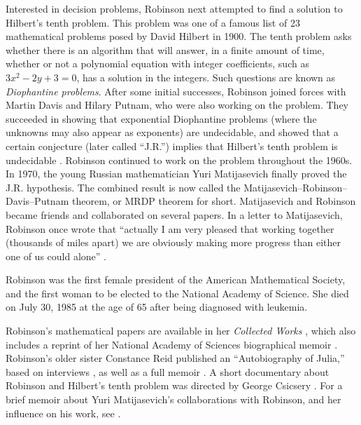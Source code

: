 \documentclass[../../../include/open-logic-section]{subfiles}
\begin{document}
Interested in decision problems, Robinson next attempted to find a
solution to Hilbert's tenth problem. This problem was one of a famous
list of 23 mathematical problems posed by David Hilbert in 1900. The
tenth problem asks whether there is an algorithm that will answer, in
a finite amount of time, whether or not a polynomial equation with
integer coefficients, such as $3x^2 - 2y +3 = 0$, has a solution in
the integers. Such questions are known as \emph{Diophantine problems}.
After some initial successes, Robinson joined forces with Martin Davis
and Hilary Putnam, who were also working on the problem. They
succeeded in showing that exponential Diophantine problems (where the
unknowns may also appear as exponents) are undecidable, and showed
that a certain conjecture (later called ``J.R.'')  implies that
Hilbert's tenth problem is undecidable
\cite{DavisPutnamRobinson1961}.  Robinson continued to work on the
problem throughout the 1960s.  In 1970, the young Russian
mathematician Yuri Matijasevich finally proved the J.R. hypothesis.
The combined result is now called the
Matijasevich--Robinson--Davis--Putnam theorem, or MRDP theorem for short.
Matijasevich and Robinson became friends and collaborated on several
papers. In a letter to Matijasevich, Robinson once wrote that
``actually I am very pleased that working together (thousands of miles
apart) we are obviously making more progress than either one of us
could alone'' \cite[45]{Matijasevich1992}.

Robinson was the first female president of the American Mathematical
Society, and the first woman to be elected to the National
Academy of Science. She died on July 30, 1985 at the age of 65 after
being diagnosed with leukemia.

\begin{reading}
Robinson's mathematical papers are available in her \textit{Collected
  Works} \cite{Robinson1996}, which also includes a reprint of her
National Academy of Sciences biographical memoir
\cite{Feferman1994}. Robinson's older sister Constance Reid published
an ``Autobiography of Julia,'' based on interviews \cite{Reid1986},
as well as a full memoir \cite{Reid1996}. A short documentary about
Robinson and Hilbert's tenth problem was directed by George Csicsery
\cite{Csicsery2016}. For a brief memoir about Yuri Matijasevich's
collaborations with Robinson, and her influence on his work, see
\cite{Matijasevich1992}.
\end{reading}
\end{document}

